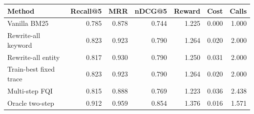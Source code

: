 \begin{tabular}{lrrrrrr}
\toprule
Method & Recall@5 & MRR & nDCG@5 & Reward & Cost & Calls \\
\midrule
Vanilla BM25 & 0.785 & 0.878 & 0.744 & 1.225 & 0.000 & 1.000 \\
Rewrite-all keyword & 0.823 & 0.923 & 0.790 & 1.264 & 0.020 & 2.000 \\
Rewrite-all entity & 0.817 & 0.930 & 0.790 & 1.250 & 0.031 & 2.000 \\
Train-best fixed trace & 0.823 & 0.923 & 0.790 & 1.264 & 0.020 & 2.000 \\
Multi-step FQI & 0.815 & 0.888 & 0.769 & 1.223 & 0.036 & 2.438 \\
Oracle two-step & 0.912 & 0.959 & 0.854 & 1.376 & 0.016 & 1.571 \\
\bottomrule
\end{tabular}
